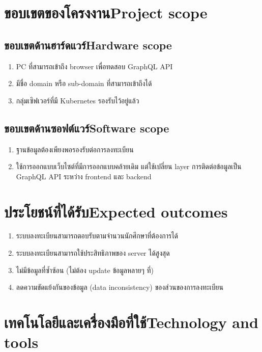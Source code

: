 \section{\ifcpe ขอบเขตของโครงงาน\else Project scope\fi}

\subsection{\ifcpe ขอบเขตด้านฮาร์ดแวร์\else Hardware scope\fi}
\begin{enumerate}
    \item PC ที่สามารถเข้าถึง browser เพื่อทดสอบ GraphQL API
    \item มีชื่อ domain หรือ sub-domain ที่สามารถเข้าถึงได้
    \item กลุ่มเซิฟเวอร์ที่มี Kubernetes รองรับไว้อยู่แล้ว
\end{enumerate}
\subsection{\ifcpe ขอบเขตด้านซอฟต์แวร์\else Software scope\fi}
\begin{enumerate}
    \item ฐานข้อมูลต้องเพียงพอรองรับต่อการลงทะเบียน
    \item ใช้การออกแบบเว็บไซต์ที่มีการออกแบบคล้ายเดิม แต่ใช้เปลี่ยน layer การติดต่อข้อมูลเป็น GraphQL API \cite{graphql} ระหว่าง frontend และ backend
\end{enumerate}
\section{\ifcpe ประโยชน์ที่ได้รับ\else Expected outcomes\fi}
\begin{enumerate}
    \item ระบบลงทะเบียนสามารถตอบรับตามจำนวนนักศึกษาที่ต้องการได้
    \item ระบบลงทะเบียนสามารถใช้ประสิทธิภาพของ server ได้สูงสุด
    \item ไม่มีข้อมูลที่ซ้ำซ้อน (ไม่ต้อง update ข้อมูลหลายๆ ที่)
    \item ลดความขัดแย้งกันของข้อมูล (data inconsistency) ของส่วนของการลงทะเบียน
\end{enumerate}

\section{\ifcpe เทคโนโลยีและเครื่องมือที่ใช้\else Technology and tools\fi}

